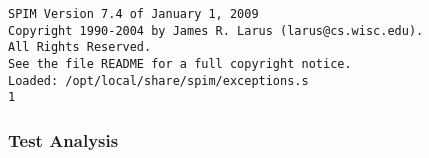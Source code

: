 \begin{verbatim}
SPIM Version 7.4 of January 1, 2009
Copyright 1990-2004 by James R. Larus (larus@cs.wisc.edu).
All Rights Reserved.
See the file README for a full copyright notice.
Loaded: /opt/local/share/spim/exceptions.s
1
\end{verbatim}\subsubsection{Test Analysis}

